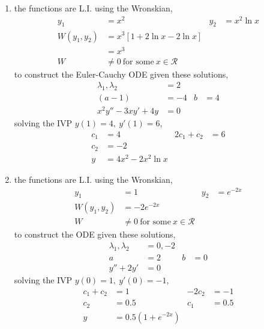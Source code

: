 \begin{enumerate}
    \item the functions are L.I. using the Wronskian,
          \begin{align}
              y_{1}           & = x^{2}                                    & y_{2} & = x^{2}\ln x \\
              W(y_{1}, y_{2}) & = x^{3}[1 + 2\ln x - 2\ln x]                                      \\
                              & = x^{3}                                                           \\
              W               & \neq 0\ \text{for some}\ x \in \mathcal{R}
          \end{align}
          to construct the Euler-Cauchy ODE given these solutions,
          \begin{align}
              \lambda_{1}, \lambda_{2} & = 2            \\
              (a-1)                    & = -4 & b & = 4 \\
              x^{2}y'' - 3xy' + 4y     & = 0
          \end{align}
          solving the IVP $ y(1) = 4,\ y'(1) = 6 $,
          \begin{align}
              c_{1} & = 4                      & 2c_{1} + c_{2} & = 6 \\
              c_{2} & = -2                                            \\
              y     & = 4x^{2}  - 2 x^{2}\ln x
          \end{align}

    \item the functions are L.I. using the Wronskian,
          \begin{align}
              y_{1}           & = 1                                        & y_{2} & = e^{-2x} \\
              W(y_{1}, y_{2}) & = -2e^{-2x}                                                    \\
              W               & \neq 0\ \text{for some}\ x \in \mathcal{R}
          \end{align}
          to construct the ODE given these solutions,
          \begin{align}
              \lambda_{1}, \lambda_{2} & = 0, -2           \\
              a                        & = 2     & b & = 0 \\
              y'' + 2y'                & = 0
          \end{align}
          solving the IVP $ y(0) = 1,\ y'(0) = -1 $,
          \begin{align}
              c_{1} + c_{2} & = 1                 & -2c_{2} & = -1  \\
              c_{2}         & = 0.5               & c_{1}   & = 0.5 \\
              y             & = 0.5 (1 + e^{-2x})
          \end{align}


\end{enumerate}
